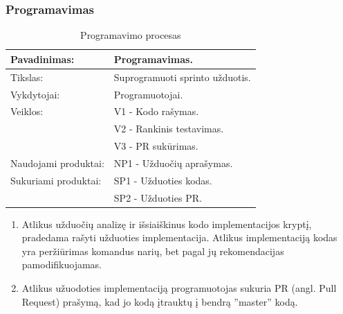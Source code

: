 \documentclass{VUMIFPSkursinis}
\begin{document}
	\subsubsection{Programavimas}
	\begin{center}
		\begin{table}[ht]
			\caption{Programavimo procesas}
			\begin{tabular}{ | l | l | }
				\hline
				Pavadinimas:		& Programavimas.			\\ \hline
				Tikslas:		& Suprogramuoti sprinto užduotis.	\\ \hline
				Vykdytojai:		& Programuotojai.			\\ \hline
				Veiklos:		& V1 - Kodo rašymas.			\\
							& V2 - Rankinis testavimas. 		\\
							& V3 - PR sukūrimas.			\\ \hline
				Naudojami produktai:	& NP1 - Užduočių aprašymas.		\\ \hline
				Sukuriami produktai:	& SP1 - Užduoties kodas. 		\\
							& SP2 - Užduoties PR.			\\ \hline
			\end{tabular}
		\end{table}
	\end{center}
		\begin{enumerate}
			\item{
				Atlikus užduočių analizę ir išsiaiškinus kodo implementacijos kryptį, pradedama rašyti užduoties implementacija.
				Atlikus implementaciją kodas yra peržiūrimas komandus narių, bet pagal jų rekomendacijas pamodifikuojamas.
			}
			\item{Atlikus užuodoties implementaciją programuotojas sukuria PR (angl. Pull Request) prašymą, kad jo kodą įtrauktų į bendrą ''master'' kodą.}
		\end{enumerate}
\end{document}
